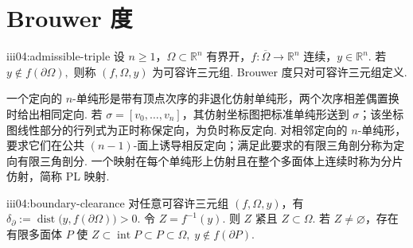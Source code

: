 \section{Brouwer 度}\label{sec:iii04-brouwer-degree}

\begin{FADefinition}[B][可容许三元组与定向约定]{iii04:admissible-triple}
设 \(\displaystyle n\geqslant1\)，\(\displaystyle \Omega\subset\mathbb R^n\) 有界开，\(\displaystyle f:\overline\Omega\to\mathbb R^n\) 连续，\(\displaystyle y\in\mathbb R^n\). 若
\(\displaystyle y\notin f(\partial\Omega),\)
则称 \(\displaystyle(f,\Omega,y)\) 为可容许三元组. Brouwer 度只对可容许三元组定义.

一个定向的 \(\displaystyle n\)-单纯形是带有顶点次序的非退化仿射单纯形，两个次序相差偶置换时给出相同定向. 若 \(\displaystyle \sigma=[v_0,\dots,v_n]\)，其仿射坐标图把标准单纯形送到 \(\displaystyle\sigma\)；该坐标图线性部分的行列式为正时称保定向，为负时称反定向. 对相邻定向的 \(\displaystyle n\)-单纯形，要求它们在公共 \(\displaystyle(n-1)\)-面上诱导相反定向；满足此要求的有限三角剖分称为定向有限三角剖分. 一个映射在每个单纯形上仿射且在整个多面体上连续时称为分片仿射，简称 PL 映射.
\end{FADefinition}

\begin{FALemma}[C][边界间隙与多面体局部化]{iii04:boundary-clearance}
对任意可容许三元组 \(\displaystyle(f,\Omega,y)\)，有
\(\displaystyle \delta_{\partial} := \operatorname{dist}\bigl(y,f(\partial\Omega)\bigr)>0.\)
令 \(\displaystyle Z=f^{-1}(y)\). 则 \(\displaystyle Z\) 紧且 \(\displaystyle Z\subset\Omega\). 若 \(\displaystyle Z\neq\varnothing\)，存在有限多面体 \(\displaystyle P\) 使
\(\displaystyle Z\subset\operatorname{int}P\subset P\subset\Omega, \; y\notin f(\partial P).\)
\end{FALemma}

